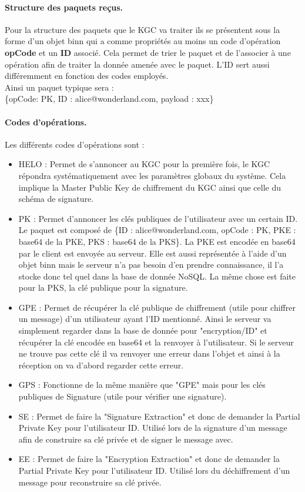\paragraph*{Structure des paquets reçus.}
Pour la structure des paquets que le KGC va traiter ils se présentent sous la forme d'un objet binn qui a comme propriétés au moins un code d'opération \textbf{opCode} et un \textbf{ID} associé. Cela permet de trier le paquet et de l'associer à une opération afin de traiter la donnée amenée avec le paquet. L'ID sert aussi différemment en fonction des codes employés.\\
Ainsi un paquet typique sera : \\
\{opCode: PK, ID : alice@wonderland.com, payload : xxx\}
\paragraph*{Codes d'opérations.}
Les différents codes d'opérations sont :
\begin{itemize}
	\item HELO : Permet de s'annoncer au KGC pour la première fois, le KGC répondra systématiquement avec les paramètres globaux du système. Cela implique la Master Public Key de chiffrement du KGC ainsi que celle du schéma de signature. 
	\item PK : Permet d'annoncer les clés publiques de l'utilisateur avec un certain ID. Le paquet est composé de \{ID : alice@wonderland.com, opCode : PK, PKE : base64 de la PKE, PKS : base64 de la PKS\}. La PKE est encodée en base64 par le client est envoyée au serveur. Elle est aussi représentée à l'aide d'un objet binn mais le serveur n'a pas besoin d'en prendre connaissance, il l'a stocke donc tel quel dans la base de donnée NoSQL. La même chose est faite pour la PKS, la clé publique pour la signature.
	\item GPE : Permet de récupérer la clé publique de chiffrement (utile pour chiffrer un message) d'un utilisateur ayant l'ID mentionné. Ainsi le serveur va simplement regarder dans la base de donnée pour "encryption/ID" et récupérer la clé encodée en base64 et la renvoyer à l'utilisateur. Si le serveur ne trouve pas cette clé il va renvoyer une erreur dans l'objet et ainsi à la réception on va d'abord regarder cette erreur.
	\item GPS : Fonctionne de la même manière que "GPE" mais pour les clés publiques de Signature (utile pour vérifier une signature).
	\item SE : Permet de faire la "Signature Extraction" et donc de demander la Partial Private Key pour l'utilisateur ID. Utilisé lors de la signature d'un message afin de construire sa clé privée et de signer le message avec. 
	\item EE : Permet de faire la "Encryption Extraction" et donc de demander la Partial Private Key pour l'utilisateur ID. Utilisé lors du déchiffrement d'un message pour reconstruire sa clé privée.
\end{itemize}
